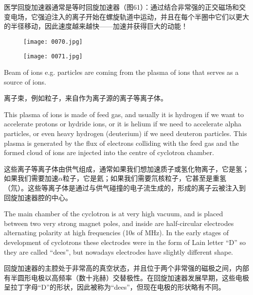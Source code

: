 \documentclass[dvipsnames, svgnames,a4paper,11pt]{article}
\begin{document}
医学回旋加速器通常是等时回旋加速器（图61）：通过结合非常强的正交磁场和交变电场，它强迫注入的离子开始在螺旋轨道中运动，并且在每个半圈中它们以更大的半径移动，因此速度越来越快——加速并获得巨大的动能！

\begin{figure}[ht]
    \centering
    \texttt{[image: 0070.jpg]}
     \label{fig61}
\end{figure}

\begin{figure}[ht]
    \centering
    \texttt{[image: 0071.jpg]}
     \label{fig62}
\end{figure}

Beam of ions e.g. particles are coming from the plasma of ions that serves as a source of ions.
  
离子束，例如粒子，来自作为离子源的离子等离子体。
  
This plasma of ions is made of feed gas, and usually it is hydrogen if we want to accelerate protons or hydride ions, or it is helium if we need to accelerate alpha particles, or even heavy hydrogen (deuterium) if we need deuteron particles. This plasma is generated by the flux of electrons colliding with the feed gas and the formed cloud of ions are injected into the centre of cyclotron chamber.
  
这些离子等离子体由供气组成，通常如果我们想加速质子或氢化物离子，它是氢；如果我们需要加速$\alpha$粒子，它是氦；如果我们需要氘核粒子，它甚至是重氢（氘）。这些等离子体是通过与供气碰撞的电子流生成的，形成的离子云被注入到回旋加速器腔的中心。



The main chamber of the cyclotron is at very high vacuum, and is placed between two very strong magnet poles, and inside are half-circular electrodes alternating polarity at high frequencies (10s of MHz). In the early stages of development of cyclotrons these electrodes were in the form of Lain letter “D” so they are called “dees”, but nowadays electrodes have slightly different shape.
  
回旋加速器的主腔处于非常高的真空状态，并且位于两个非常强的磁极之间，内部有半圆形电极以高频率（数十兆赫）交替极性。在回旋加速器发展早期，这些电极呈拉丁字母“D”的形状，因此被称为“dees”，但现在电极的形状略有不同。
\end{document}
